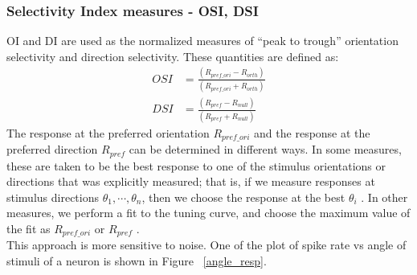 \documentclass[11pt]{article}
\begin{document}
\subsubsection{Selectivity Index measures - OSI, DSI} %
\label{ssub:traditional_selectivity_measures_oi_di_and_osi}
OI and DI are used as the normalized measures of ``peak to trough'' orientation selectivity and direction selectivity.
These quantities are defined as:
\begin{align}
    OSI &= \frac{(R_{pref\_ori} - R_{orth})}{(R_{pref\_ori} + R_{orth})}\\
    DSI &= \frac{(R_{pref} - R_{null})}{(R_{pref} + R_{null})}
\end{align}
The response at the preferred orientation $R_{pref\_ori}$ and the response at the preferred direction $R_{pref}$ can be determined in different ways. In some measures, these are taken to be the best response to one of the stimulus orientations or directions that was explicitly measured; that is, if we measure responses at stimulus directions $\theta_1, \cdots, \theta_n$, then we choose the response at the best $\theta_i$ . In other measures, we perform a fit to the tuning curve, and choose the maximum value of the fit as $R_{pref\_ori}$ or $R_{pref}$ .\\
This approach is more sensitive to noise. One of the plot of spike rate vs angle of stimuli of a neuron is shown in Figure ~\ref{angle_resp}.
\end{document}
